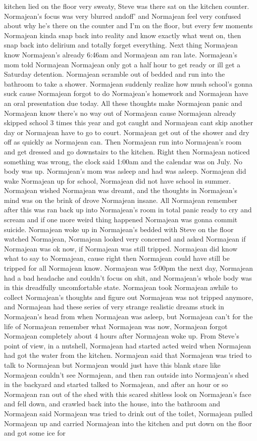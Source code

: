 \documentclass[12pt]{book}
\begin{document}
kitchen lied on the floor very sweaty, Steve was there sat on the kitchen counter. Normajean's focus was very blurred andoff' and Normajean feel very confused about why he's there on the counter and I'm on the floor, but every few moments Normajean kinda snap back into reality and know exactly what went on, then snap back into delirium and totally forget everything. Next thing Normajean know Normajean's already 6:46am and Normajean am ran late. Normajean's mom told Normajean Normajean only got a half hour to get ready or ill get a Saturday detention. Normajean scramble out of bedded and run into the bathroom to take a shower. Normajean suddenly realize how mush school's gonna suck cause Normajean forgot to do Normajean's homework and Normajean have an oral presentation due today. All these thoughts make Normajean panic and Normajean know there's no way out of Normajean cause Normajean already skipped school 3 times this year and got caught and Normajean cant skip another day or Normajean have to go to court. Normajean get out of the shower and dry off as quickly as Normajean can. Then Normajean run into Normajean's room and get dressed and go downstairs to the kitchen. Right then Normajean noticed something was wrong, the clock said 1:00am and the calendar was on July. No body was up. Normajean's mom was asleep and had was asleep. Normajean did wake Normajean up for school, Normajean did not have school in summer. Normajean wished Normajean was dreamt, and the thoughts in Normajean's mind was on the brink of drove Normajean insane. All Normajean remember after this was ran back up into Normajean's room in total panic ready to cry and scream and if one more weird thing happened Normajean was gonna commit suicide. Normajean woke up in Normajean's bedded with Steve on the floor watched Normajean, Normajean looked very concerned and asked Normajean if Normajean was ok now, if Normajean was still tripped. Normajean did know what to say to Normajean, cause right then Normajean could have still be tripped for all Normajean know. Normajean was 5:00pm the next day, Normajean had a bad headache and couldn't focus on shit, and Normajean's whole body was in this dreadfully uncomfortable state. Normajean took Normajean awhile to collect Normajean's thoughts and figure out Normajean was not tripped anymore, and Normajean had these series of very strange realistic dreams stuck in Normajean's head from when Normajean was asleep, but Normajean can't for the life of Normajean remember what Normajean was now, Normajean forgot Normajean completely about 4 hours after Normajean woke up. From Steve's point of view, in a nutshell, Normajean had started acted weird when Normajean had got the water from the kitchen. Normajean said that Normajean was tried to talk to Normajean but Normajean would just have this blank stare like Normajean couldn't see Normajean, and then ran outside into Normajean's shed in the backyard and started talked to Normajean, and after an hour or so Normajean ran out of the shed with this scared shitless look on Normajean's face and fell down, and crawled back into the house, into the bathroom and Normajean said Normajean was tried to drink out of the toilet, Normajean pulled Normajean up and carried Normajean into the kitchen and put down on the floor and got some ice for 
\end{document}
